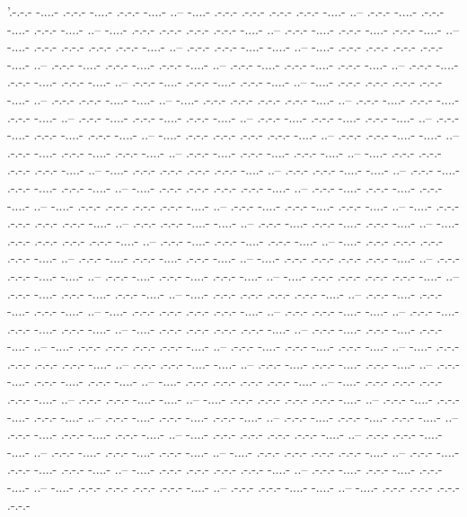 \documentclass[a4paper,11pt]{article}
\begin{document}
\newpage\noindent
'.-.-.- -....- .-.-.- -....- .-.-.- -....- ..-- -....- .-.-.- .-.-.- .-.-.- .-.-.- -....- ..-- .-.-.- -....- .-.-.- -....- .-.-.- -....- ..-- -....- .-.-.- .-.-.- .-.-.- .-.-.- -....- ..-- .-.-.- -....- .-.-.- -....- .-.-.- -....- ..-- -....- .-.-.- .-.-.- .-.-.- .-.-.- -....- ..-- .-.-.- .-.-.- -....- -....- ..-- -....- .-.-.- .-.-.- .-.-.- .-.-.- -....- ..-- .-.-.- -....- .-.-.- -....- .-.-.- -....- ..-- .-.-.- -....- .-.-.- -....- .-.-.- -....- ..-- .-.-.- -....- .-.-.- -....- .-.-.- -....- ..-- .-.-.- -....- .-.-.- -....- .-.-.- -....- ..-- -....- .-.-.- .-.-.- .-.-.- .-.-.- -....- ..-- .-.-.- .-.-.- -....- -....- ..-- -....- .-.-.- .-.-.- .-.-.- .-.-.- -....- ..-- .-.-.- -....- .-.-.- -....- .-.-.- -....- ..-- .-.-.- -....- .-.-.- -....- .-.-.- -....- ..-- .-.-.- -....- .-.-.- -....- .-.-.- -....- ..-- .-.-.- -....- .-.-.- -....- .-.-.- -....- ..-- -....- .-.-.- .-.-.- .-.-.- .-.-.- -....- ..-- .-.-.- .-.-.- -....- -....- ..-- .-.-.- -....- .-.-.- -....- .-.-.- -....- ..-- .-.-.- -....- .-.-.- -....- .-.-.- -....- ..-- -....- .-.-.- .-.-.- .-.-.- .-.-.- -....- ..-- -....- .-.-.- .-.-.- .-.-.- .-.-.- -....- ..-- .-.-.- .-.-.- -....- -....- ..-- .-.-.- -....- .-.-.- -....- .-.-.- -....- ..-- -....- .-.-.- .-.-.- .-.-.- .-.-.- -....- ..-- .-.-.- -....- .-.-.- -....- .-.-.- -....- ..-- -....- .-.-.- .-.-.- .-.-.- .-.-.- -....- ..-- .-.-.- -....- .-.-.- -....- .-.-.- -....- ..-- -....- .-.-.- .-.-.- .-.-.- .-.-.- -....- ..-- .-.-.- .-.-.- -....- -....- ..-- .-.-.- -....- .-.-.- -....- .-.-.- -....- ..-- -....- .-.-.- .-.-.- .-.-.- .-.-.- -....- ..-- .-.-.- -....- .-.-.- -....- .-.-.- -....- ..-- -....- .-.-.- .-.-.- .-.-.- .-.-.- -....- ..-- .-.-.- -....- .-.-.- -....- .-.-.- -....- ..-- -....- .-.-.- .-.-.- .-.-.- .-.-.- -....- ..-- .-.-.- .-.-.- -....- -....- ..-- .-.-.- -....- .-.-.- -....- .-.-.- -....- ..-- -....- .-.-.- .-.-.- .-.-.- .-.-.- -....- ..-- .-.-.- -....- .-.-.- -....- .-.-.- -....- ..-- -....- .-.-.- .-.-.- .-.-.- .-.-.- -....- ..-- .-.-.- -....- .-.-.- -....- .-.-.- -....- ..-- -....- .-.-.- .-.-.- .-.-.- .-.-.- -....- ..-- .-.-.- .-.-.- -....- -....- ..-- .-.-.- -....- .-.-.- -....- .-.-.- -....- ..-- -....- .-.-.- .-.-.- .-.-.- .-.-.- -....- ..-- .-.-.- -....- .-.-.- -....- .-.-.- -....- ..-- -....- .-.-.- .-.-.- .-.-.- .-.-.- -....- ..-- .-.-.- -....- .-.-.- -....- .-.-.- -....- ..-- -....- .-.-.- .-.-.- .-.-.- .-.-.- -....- ..-- .-.-.- .-.-.- -....- -....- ..-- .-.-.- -....- .-.-.- -....- .-.-.- -....- ..-- .-.-.- -....- .-.-.- -....- .-.-.- -....- ..-- -....- .-.-.- .-.-.- .-.-.- .-.-.- -....- ..-- -....- .-.-.- .-.-.- .-.-.- .-.-.- -....- ..-- .-.-.- .-.-.- -....- -....- ..-- -....- .-.-.- .-.-.- .-.-.- .-.-.- -....- ..-- .-.-.- -....- .-.-.- -....- .-.-.- -....- ..-- .-.-.- -....- .-.-.- -....- .-.-.- -....- ..-- .-.-.- -....- .-.-.- -....- .-.-.- -....- ..-- .-.-.- -....- .-.-.- -....- .-.-.- -....- ..-- -....- .-.-.- .-.-.- .-.-.- .-.-.- -....- ..-- .-.-.- .-.-.- -....- -....- ..-- .-.-.- -....- .-.-.- -....- .-.-.- -....- ..-- -....- .-.-.- .-.-.- .-.-.- .-.-.- -....- ..-- .-.-.- -....- .-.-.- -....- .-.-.- -....- ..-- -....- .-.-.- .-.-.- .-.-.- .-.-.- -....- ..-- .-.-.- -....- .-.-.- -....- .-.-.- -....- ..-- -....- .-.-.- .-.-.- .-.-.- .-.-.- -....- ..-- .-.-.- .-.-.- -....- -....- ..-- -....- .-.-.- .-.-.- .-.-.- .-.-.- 
\end{document}

